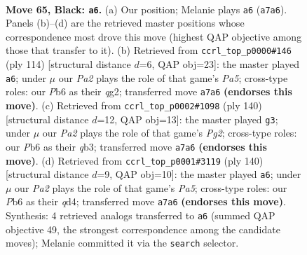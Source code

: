\documentclass[11pt]{article}
\begin{document}
\clearpage

\begin{figure}[p]\centering
\begin{subfigure}{0.46\textwidth}\centering
\resizebox{\linewidth}{!}{%
\newchessgame
\chessboard[
  setfen={8/p6k/1p6/8/q1P5/2K5/8/8 b - - 3 65},
  showmover=false,
  pgfstyle=straightmove, color=movearrow, markmove={a7-a6}
]}
\caption{}
\end{subfigure}\hfill
\begin{subfigure}{0.46\textwidth}\centering
\resizebox{\linewidth}{!}{%
\newchessgame
\chessboard[
  setfen={8/3k4/1Q1p4/P7/8/2K5/6q1/8 w - - 10 58},
  showmover=false,
  pgfstyle=straightmove, color=movearrow, markmove={a5-a6}
]}
\caption{}
\end{subfigure}
\\[4pt]
\begin{subfigure}{0.46\textwidth}\centering
\resizebox{\linewidth}{!}{%
\newchessgame
\chessboard[
  setfen={8/6Q1/K6p/7k/8/1q6/6P1/8 w - - 0 71},
  showmover=false,
  pgfstyle=straightmove, color=movearrow, markmove={g2-g3}
]}
\caption{}
\end{subfigure}\hfill
\begin{subfigure}{0.46\textwidth}\centering
\resizebox{\linewidth}{!}{%
\newchessgame
\chessboard[
  setfen={1K6/8/8/P7/3q4/Q4p2/6k1/8 w - - 8 71},
  showmover=false,
  pgfstyle=straightmove, color=movearrow, markmove={a5-a6}
]}
\caption{}
\end{subfigure}
\caption{\textbf{Move 65, Black: \texttt{a6}.} (a) Our position; Melanie plays \texttt{a6} (\texttt{a7a6}). Panels (b)--(d) are the retrieved master positions whose correspondence most drove this move (highest QAP objective among those that transfer to it). (b) Retrieved from \texttt{ccrl\_top\_p0000\#146} (ply 114) [structural distance $d$=6, QAP obj=23]: the master played \texttt{a6}; under $\mu$ our \emph{Pa2} plays the role of that game's \emph{Pa5}; cross-type roles: our \emph{P}b6 as their \emph{q}g2; transferred move \texttt{a7a6} \textbf{(endorses this move)}. (c) Retrieved from \texttt{ccrl\_top\_p0002\#1098} (ply 140) [structural distance $d$=12, QAP obj=13]: the master played \texttt{g3}; under $\mu$ our \emph{Pa2} plays the role of that game's \emph{Pg2}; cross-type roles: our \emph{P}b6 as their \emph{q}b3; transferred move \texttt{a7a6} \textbf{(endorses this move)}. (d) Retrieved from \texttt{ccrl\_top\_p0001\#3119} (ply 140) [structural distance $d$=9, QAP obj=10]: the master played \texttt{a6}; under $\mu$ our \emph{Pa2} plays the role of that game's \emph{Pa5}; cross-type roles: our \emph{P}b6 as their \emph{q}d4; transferred move \texttt{a7a6} \textbf{(endorses this move)}. Synthesis: 4 retrieved analogs transferred to \texttt{a6} (summed QAP objective 49, the strongest correspondence among the candidate moves); Melanie committed it via the \texttt{search} selector.}
\label{fig:thought-m129}
\end{figure}
\end{document}
